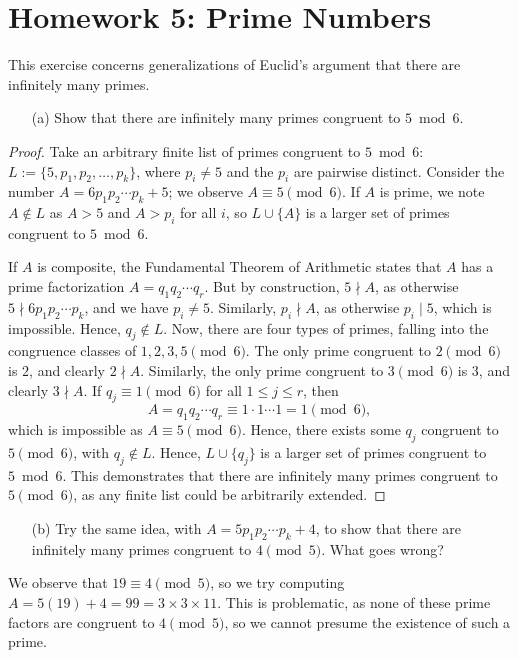 \documentclass{article}
\begin{document}
\newpage
\section*{Homework 5: Prime Numbers}
\begin{exercise}[Chapter 12, \#2]
This exercise concerns generalizations of Euclid's argument that there are infinitely many primes.
\begin{itemize}
    \item[(a)] Show that there are infinitely many primes congruent to $5\bmod 6$.
\end{itemize}
\begin{proof}
Take an arbitrary finite list of primes congruent to $5\bmod 6$: $L := \{5, p_1, p_2, \ldots, p_k\}$, where $p_i\neq 5$ and the $p_i$ are pairwise distinct. Consider the number $A = 6p_1p_2\cdots p_k+5$; we observe $A\equiv 5\pmod 6$. If $A$ is prime, we note $A\not\in L$ as $A>5$ and $A>p_i$ for all $i$, so $L\cup\{A\}$ is a larger set of primes congruent to $5\bmod 6$.

If $A$ is composite, the Fundamental Theorem of Arithmetic states that $A$ has a prime factorization $A = q_1q_2\cdots q_r$. But by construction, $5\nmid A$, as otherwise $5\nmid 6p_1p_2\cdots p_k$, and we have $p_i\neq 5$. Similarly, $p_i\nmid A$, as otherwise $p_i\mid 5$, which is impossible. Hence, $q_j\not \in L$. Now, there are four types of primes, falling into the congruence classes of $1, 2, 3, 5\pmod 6$. The only prime congruent to $2\pmod 6$ is $2$, and clearly $2\nmid A$. Similarly, the only prime congruent to $3\pmod 6$ is $3$, and clearly $3\nmid A$. If $q_j\equiv 1\pmod 6$ for all $1\leq j \leq r$, then
$$A = q_1q_2\cdots q_r\equiv 1\cdot 1\cdots 1 = 1\pmod 6,$$
which is impossible as $A\equiv 5\pmod 6$. Hence, there exists some $q_j$ congruent to $5\pmod 6$, with $q_j\not\in L$. Hence, $L\cup \{q_j\}$ is a larger set of primes congruent to $5\bmod 6$. This demonstrates that there are infinitely many primes congruent to $5\pmod 6$, as any finite list could be arbitrarily extended.
\end{proof}

\begin{itemize}
    \item[(b)] Try the same idea, with $A = 5p_1p_2\cdots p_k+4$, to show that there are infinitely many primes congruent to $4\pmod 5$. What goes wrong? 
\end{itemize}
\begin{solution}
We observe that $19\equiv 4\pmod 5$, so we try computing $A = 5(19) + 4 = 99 = 3\times 3\times 11$. This is problematic, as none of these prime factors are congruent to $4\pmod 5$, so we cannot presume the existence of such a prime.
\end{solution}
\end{exercise}
\end{document}
